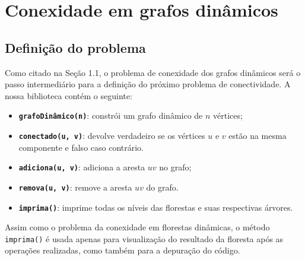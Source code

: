 
\chapter{Conexidade em grafos dinâmicos}

\enlargethispage{.8\baselineskip}

\section{Definição do problema}

Como citado na Seção 1.1, o problema de conexidade dos grafos dinâmicos será o passo intermediário para a definição do próximo problema de conectividade. A nossa biblioteca contém o seguinte:

\begin{itemize}
    \item \texttt{\textbf{grafoDinâmico(n)}}: constrói um grafo dinâmico de $n$ vértices;
    \item \texttt{\textbf{conectado(u, v)}}: devolve verdadeiro se os vértices $u$ e $v$ estão na mesma componente e falso caso contrário.
    \item \texttt{\textbf{adiciona(u, v)}}: adiciona a aresta $uv$ no grafo;
    \item \texttt{\textbf{remova(u, v)}}: remove a aresta $uv$ do grafo.
    \item \texttt{\textbf{imprima()}}: imprime todas os níveis das florestas e suas respectivas árvores.
\end{itemize}

Assim como o problema da conexidade em florestas dinâmicas, o método \texttt{imprima()} é usada apenas para visualização do resultado da floresta após as operações realizadas, como também para a depuração do código. 